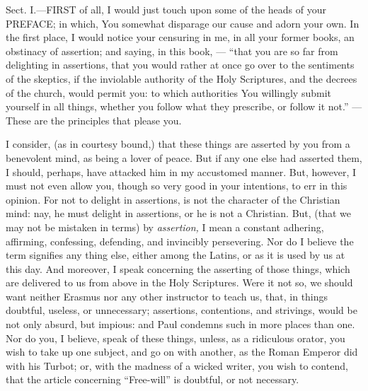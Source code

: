 
Sect. I.—FIRST of all, I would just touch upon some of the heads of your PREFACE; in which, You somewhat disparage our cause and adorn your own. In the first place, I would notice your censuring in me, in all your former books, an obstinacy of assertion; and saying, in this book, — “that you are so far from delighting in assertions, that you would rather at once go over to the sentiments of the skeptics, if the inviolable authority of the Holy Scriptures, and the decrees of the church, would permit you: to which authorities You willingly submit yourself in all things, whether you follow what they prescribe, or follow it not.” — These are the principles that please you.

I consider, (as in courtesy bound,) that these things are asserted by you from a benevolent mind, as being a lover of peace. But if any one else had asserted them, I should, perhaps, have attacked him in my accustomed manner. But, however, I must not even allow you, though so very good in your intentions, to err in this opinion. For not to delight in assertions, is not the character of the Christian mind: nay, he must delight in assertions, or he is not a Christian. But, (that we may not be mistaken in terms) by \emph{assertion, }I mean a constant adhering, affirming, confessing, defending, and invincibly persevering. Nor do I believe the term signifies any thing else, either among the Latins, or as it is used by us at this day. And moreover, I speak concerning the asserting of those things, which are delivered to us from above in the Holy Scriptures. Were it not so, we should want neither Erasmus nor any other instructor to teach us, that, in things doubtful, useless, or unnecessary; assertions, contentions, and strivings, would be not only absurd, but impious: and Paul condemns such in more places than one. Nor do you, I believe, speak of these things, unless, as a ridiculous orator, you wish to take up one subject, and go on with another, as the Roman Emperor did with his Turbot; or, with the madness of a wicked writer, you wish to contend, that the article concerning “Free-will” is doubtful, or not necessary.

